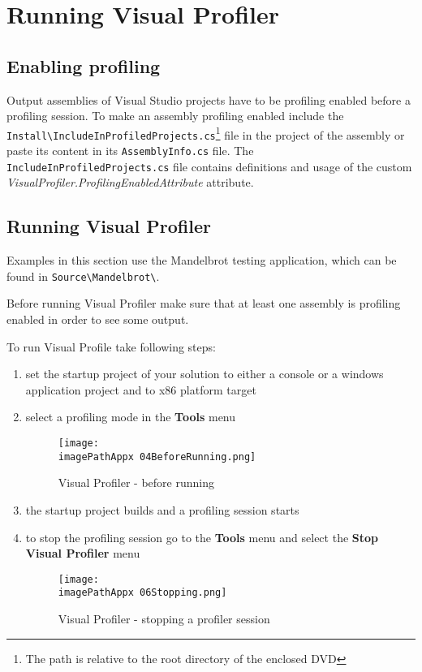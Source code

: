 \chapter{Running Visual Profiler}

\section{Enabling profiling}
Output assemblies of Visual Studio projects have to be profiling enabled before a profiling session. To make an assembly profiling enabled include the \linebreak\texttt{Install\textbackslash IncludeInProfiledProjects.cs}\footnote{The path is relative to the root directory of the enclosed DVD} file in the project of the assembly or paste its content in its \texttt{AssemblyInfo.cs} file. The \texttt{IncludeInProfiledProjects.cs} file contains definitions and usage of the custom \emph{VisualProfiler.ProfilingEnabledAttribute} attribute.

\section{Running Visual Profiler}
Examples in this section use the Mandelbrot testing application, which can be found in \texttt{Source\textbackslash Mandelbrot\textbackslash}\footnotemark[\value{footnote}].

Before running Visual Profiler make sure that at least one assembly is profiling enabled in order to see some output.

To run Visual Profile take following steps:
\begin{enumerate}
\item set the startup project of your solution to either a console or a windows application project and to x86 platform target

\item select a profiling mode in the \textbf{Tools} menu

\begin{figure}[H]
	\centering
		\texttt{[image: \\imagePathAppx 04BeforeRunning.png]}
		\caption{Visual Profiler - before running}
	\label{fig:0904BeforeRunning}
\end{figure}

\item the startup project builds and a profiling session starts

\item to stop the profiling session go to the \textbf{Tools} menu and select the \textbf{Stop Visual Profiler} menu

\begin{figure}[H]
	\centering
		\texttt{[image: \\imagePathAppx 06Stopping.png]}
		\caption{Visual Profiler - stopping a profiler session}
	\label{fig:0906Stopping}
\end{figure}

\end{enumerate}


